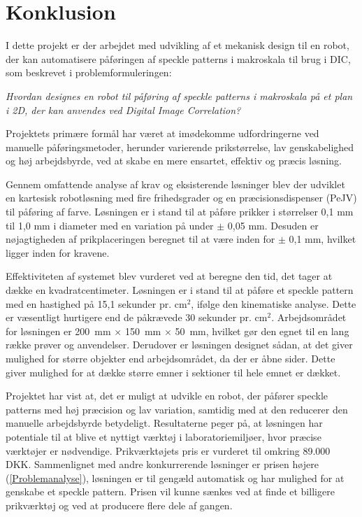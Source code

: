 \chapter{Konklusion} \label{Konklusion}
I dette projekt er der arbejdet med udvikling af et mekanisk design til en robot, der kan automatisere påføringen af speckle patterns i makroskala til brug i DIC, som beskrevet i problemformuleringen:
\begin{displayquote} 
\centering
    \textit{Hvordan designes en robot til påføring af speckle patterns i makroskala på et plan i 2D, der kan anvendes ved Digital Image Correlation?}
\end{displayquote}

Projektets primære formål har været at imødekomme udfordringerne ved manuelle påføringsmetoder, herunder varierende prikstørrelse, lav genskabelighed og høj arbejdsbyrde, ved at skabe en mere ensartet, effektiv og præcis løsning.

Gennem omfattende analyse af krav og eksisterende løsninger blev der udviklet en kartesisk robotløsning med fire frihedsgrader og en præcisionsdispenser (PeJV) til påføring af farve. Løsningen er i stand til at påføre prikker i størrelser 0,1 mm til 1,0 mm i diameter med en variation på under $\pm$ 0,05 mm. Desuden er nøjagtigheden af prikplaceringen beregnet til at være inden for $\pm$ 0,1 mm, hvilket ligger inden for kravene.

Effektiviteten af systemet blev vurderet ved at beregne den tid, det tager at dække en kvadratcentimeter. Løsningen er i stand til at påføre et speckle pattern med en hastighed på 15,1 sekunder pr. \(\text{cm}^2\), ifølge den kinematiske analyse. Dette er væsentligt hurtigere end de påkrævede 30 sekunder pr. \(\text{cm}^2\). Arbejdsområdet for løsningen er \SI{200}{mm} $\times$ \SI{150}{mm} $\times$ \SI{50}{mm}, hvilket gør den egnet til en lang række prøver og anvendelser. Derudover er løsningen designet sådan, at det giver mulighed for større objekter end arbejdsområdet, da der er åbne sider. Dette giver mulighed for at dække større emner i sektioner til hele emnet er dækket. 

Projektet har vist at, det er muligt at udvikle en robot, der påfører speckle patterns med høj præcision og lav variation, samtidig med at den reducerer den manuelle arbejdsbyrde betydeligt. Resultaterne peger på, at løsningen har potentiale til at blive et nyttigt værktøj i laboratoriemiljøer, hvor præcise værktøjer er nødvendige. Prikværktøjets pris er vurderet til omkring 89.000 DKK. Sammenlignet med andre konkurrerende løsninger er prisen højere (\ref{Problemanalyse}), løsningen er til gengæld automatisk og har mulighed for at genskabe et speckle pattern. Prisen vil kunne sænkes ved at finde et billigere prikværktøj og ved at producere flere dele af gangen.